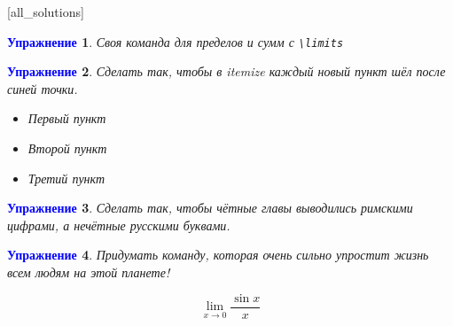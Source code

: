 \documentclass[pdftex, 12pt, a4paper]{article}
\newtheorem{problem}{\textcolor{blue}{Упражнение}}
\begin{document}

[all_solutions]

\begin{problem}
Своя команда для пределов и сумм с \verb|\limits|
\begin{sol}
\end{sol}
\end{problem}

\begin{problem}
Сделать так, чтобы в itemize каждый новый пункт шёл после синей точки.

\newcommand*{\MyPoint}{\tikz \draw [baseline, fill=blue,draw=blue] circle (2.5pt);}
\renewcommand{\labelitemi}{\MyPoint}

\begin{itemize}
\item Первый пункт
\item Второй пункт
\item Третий пункт
\end{itemize}
\end{problem}



\begin{problem}
Сделать так, чтобы чётные главы выводились римскими цифрами, а нечётные русскими буквами.
\begin{sol}
\end{sol}
\end{problem}

\begin{problem}
Придумать команду, которая очень сильно упростит жизнь всем людям на этой планете!
\begin{sol}
\end{sol}
\end{problem}


\newpage

\[ \lim_{x \to 0} \frac{\sin{x}}{x} \]




\end{document}
